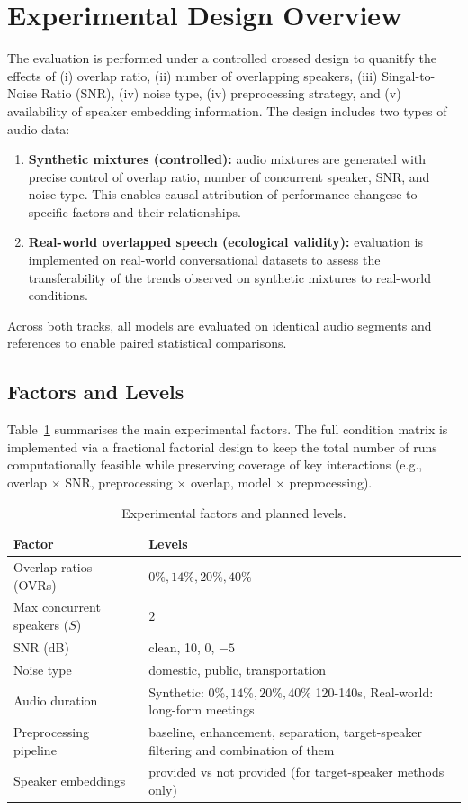 \section{Experimental Design Overview}
The evaluation is performed under a controlled crossed design to quanitfy the effects of (i) overlap ratio, (ii) number of overlapping speakers, (iii) Singal-to-Noise Ratio (SNR), (iv) noise type, (iv) preprocessing strategy, and (v) availability of speaker embedding information. The design includes two types of audio data:
\begin{enumerate}[leftmargin=*]
    \item \textbf{Synthetic mixtures (controlled):} audio mixtures are generated with precise control of overlap ratio, number of concurrent speaker, SNR, and noise type. This enables causal attribution of performance changese to specific factors and their relationships.
    \item \textbf{Real-world overlapped speech (ecological validity):} evaluation is implemented on real-world conversational datasets to assess the transferability of the trends observed on synthetic mixtures to real-world conditions.
\end{enumerate}
Across both tracks, all models are evaluated on identical audio segments and references to enable paired statistical comparisons.

\subsection{Factors and Levels}
Table~\ref{tab:design_factors} summarises the main experimental factors. The full condition matrix is implemented via a fractional factorial design to keep the total number of runs computationally feasible while preserving coverage of key interactions (e.g., overlap $\times$ SNR, preprocessing $\times$ overlap, model $\times$ preprocessing).

\begin{table}[ht]
\centering
\caption{Experimental factors and planned levels.}
\label{tab:design_factors}
\begin{tabularx}{\textwidth}{lX}
\toprule
\textbf{Factor} & \textbf{Levels} \\
\midrule
Overlap ratios (OVRs) & $0\%, 14\%, 20\%, 40\%$ \\
Max concurrent speakers ($S$) & $2$ \\
SNR (dB) & clean, 10, 0, $-5$ \\
Noise type & domestic,  public, transportation\\
Audio duration & Synthetic: $0\%, 14\%, 20\%, 40\%$ 120-140s, Real-world: long-form meetings\\
Preprocessing pipeline & baseline, enhancement, separation, target-speaker filtering and combination of them \\
Speaker embeddings & provided vs not provided (for target-speaker methods only) \\
\bottomrule
\end{tabularx}
\end{table}
